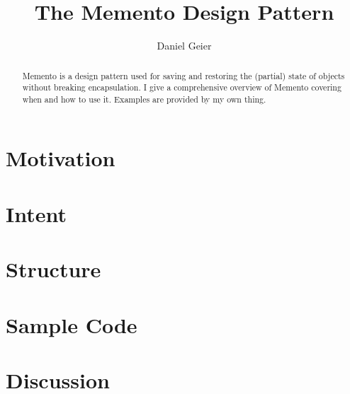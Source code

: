 \documentclass[11pt, a4paper, twoside]{article}
\title{The Memento Design Pattern}
\author{Daniel Geier}
\date{} %
\begin{document}
	\maketitle

	\begin{abstract} \noindent
		Memento is a design pattern used for saving and restoring the (partial) state of objects without breaking encapsulation. I give a comprehensive overview of Memento covering when and how to use it. Examples are provided by my own thing.
	\end{abstract}


	\section{Motivation}
	\label{motivation}
	
	 
	 \section{Intent}
	
	\section{Structure}
	
	\section{Sample Code}
	
	\section{Discussion}
	
	
	
\end{document}
